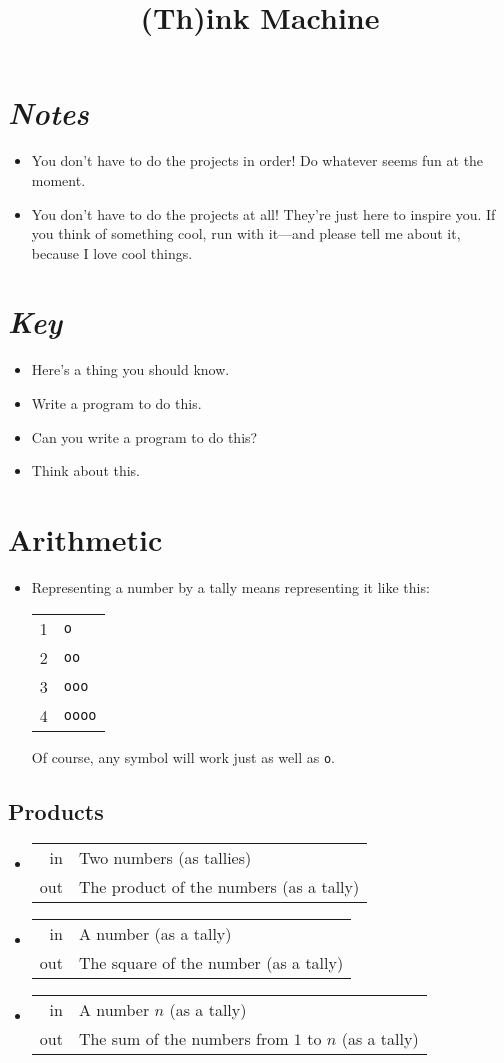 \documentclass{article}
\title{(Th)ink Machine}
\date{}
\newcommand*{\note}{\item[\Letter]}
\newcommand*{\writeit}{\item[\NibRight]}
\newcommand*\proveit{\item[\manimpossiblecube]}
\newcommand*{\thinkit}{\item[\Coffeecup]}
\newcommand{\spec}[1]{{\sc #1}}
\newcommand{\str}[1]{\texttt{#1}}
\begin{document}
\maketitle
\section*{\textit{Notes}}
\begin{itemize}
\note You don't have to do the projects in order! Do whatever seems fun at the moment.
\note You don't have to do the projects at all! They're just here to inspire you. If you think of something cool, run with it---and please tell me about it, because I love cool things.
\end{itemize}
\section*{\textit{Key}}
\begin{itemize}
\note Here's a thing you should know.
\writeit Write a program to do this.
\proveit Can you write a program to do this?
\thinkit Think about this.
\end{itemize}

\section*{Arithmetic}
\begin{itemize}
\note Representing a number by a tally means representing it like this:
\begin{center}
\begin{tabular}{rl}
1 & \str{o} \\
2 & \str{oo} \\
3 & \str{ooo} \\
4 & \str{oooo}
\end{tabular}
\end{center}
Of course, any symbol will work just as well as \str{o}.
\end{itemize}
\subsection*{Products}
\begin{itemize}
\writeit
\begin{tabular}{rl}
\spec{in} & Two numbers (as tallies) \\
\spec{out} & The product of the numbers (as a tally)
\end{tabular}
\writeit
\begin{tabular}{rl}
\spec{in} & A number (as a tally) \\
\spec{out} & The square of the number (as a tally)
\end{tabular}
\writeit
\begin{tabular}{rl}
\spec{in} & A number $n$ (as a tally) \\
\spec{out} & The sum of the numbers from $1$ to $n$ (as a tally)
\end{tabular}
\end{itemize}
\end{document}
